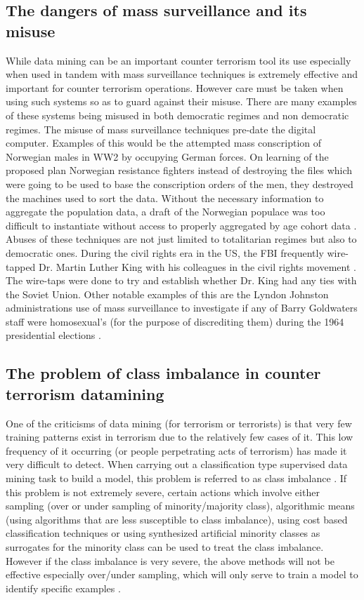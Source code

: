 \subsection{The dangers of mass surveillance and its misuse}
While data mining can be an important counter terrorism tool its use especially when used in tandem with mass surveillance techniques is extremely effective and important for counter terrorism operations. However care must be taken when using such systems so as to guard against their misuse. There are many examples of these systems being misused in both democratic regimes and non democratic regimes. The misuse of mass surveillance techniques pre-date the digital computer. Examples of this would  be the attempted mass conscription of Norwegian males in WW2 by occupying German forces. On learning of the proposed plan Norwegian resistance fighters instead of destroying the files which were going to be used to base the conscription orders of the men, they destroyed the machines used to sort the data. Without the necessary information to aggregate the population data, a draft of the Norwegian populace was too difficult to instantiate without access to properly aggregated by age cohort data \citep{bignami2007european}. Abuses of these techniques are not just limited to totalitarian regimes but also to democratic ones. During the civil rights era in the US, the FBI frequently wire-tapped Dr. Martin Luther King with his colleagues in the civil rights movement \citep{garrow2015fbi}. The wire-taps were done to try and establish whether Dr. King had any ties with the Soviet Union. Other notable examples of this are the Lyndon Johnston administrations use of mass surveillance to investigate if any of Barry Goldwaters staff were homosexual's (for the purpose of discrediting them) during the 1964 presidential elections \citep{sales2014domesticating}.

\subsection{The problem of class imbalance in counter terrorism datamining} 
One of the criticisms of data mining (for terrorism or terrorists) is that very few training patterns exist in terrorism due to the relatively few cases of it. This low frequency of it occurring (or people perpetrating acts of terrorism) has made it very difficult to detect. When carrying out a classification type supervised data mining task to build a model, this problem is referred to as class imbalance \citep{SASClassimbalance2015}. If this problem is not extremely severe, certain actions which involve either sampling (over or under sampling of minority/majority class), algorithmic means (using algorithms that are less susceptible to class imbalance), using cost based classification techniques or using synthesized artificial minority classes as surrogates for the minority class can be used to treat the class imbalance. However if the class imbalance is very severe, the above methods will not be effective especially over/under sampling, which will only serve to train a model to identify specific examples \citep{jonas2006effective}.

